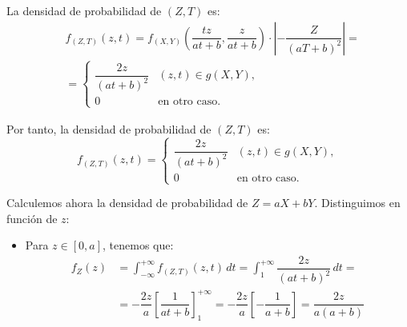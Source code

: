 \begin{ejercicio}
\begin{figure}[H]
    \end{figure}    

    La densidad de probabilidad de $(Z,T)$ es:
    \begin{align*}
        &f_{(Z,T)}(z, t) = f_{(X,Y)}\left(\dfrac{tz}{at+b},\dfrac{z}{at+b}\right)\cdot \left|- \dfrac{Z}{(aT+b)^2}\right|
        =\\&= \begin{cases}
            \dfrac{2z}{(at+b)^2} & (z,t)\in g(X,Y), \\
            0 & \text{en otro caso}.
        \end{cases}
    \end{align*}

    Por tanto, la densidad de probabilidad de $(Z,T)$ es:
    \begin{equation*}
        f_{(Z,T)}(z, t) = \begin{cases}
            \dfrac{2z}{(at+b)^2} & (z,t)\in g(X,Y), \\
            0 & \text{en otro caso}.
        \end{cases}
    \end{equation*}

    Calculemos ahora la densidad de probabilidad de $Z=aX+bY$.
    Distinguimos en función de $z$:
    \begin{itemize}
        \item Para $z\in\left[0,a\right]$, tenemos que:
        \begin{align*}
            f_Z(z)&=\int_{-\infty}^{+\infty} f_{(Z,T)}(z, t) \, dt
            = \int_{1}^{+\infty} \dfrac{2z}{(at+b)^2} \, dt
            =\\&= -\dfrac{2z}{a}\left[\dfrac{1}{at+b}\right]_{1}^{+\infty}
            = -\dfrac{2z}{a}\left[-\dfrac{1}{a+b}\right]
            = \dfrac{2z}{a(a+b)}
        \end{align*}


\end{itemize}
\end{ejercicio}
